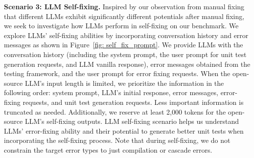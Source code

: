 
\noindent\textbf{Scenario 3: LLM Self-fixing. } 
Inspired by our observation from manual fixing that different LLMs exhibit significantly different potentials after manual fixing, we seek to investigate how LLMs perform in self-fixing on our benchmark. 
We explore LLMs' self-fixing abilities by incorporating conversation history and error messages as shown in Figure~\ref{fig: self_fix_prompt}. We provide LLMs with the conversation history (including the system prompt, the user prompt for unit test generation requests, and LLM vanilla response), error messages obtained from the testing framework, and the user prompt for error fixing requests. 
When the open-source LLM's input length is limited, we prioritize the information in the following order: system prompt, LLM's initial response, error messages, error-fixing requests, and unit test generation requests. Less important information is truncated as needed. Additionally, we reserve at least 2,000 tokens for the open-source LLM’s self-fixing outputs.
LLM self-fixing scenario helps us understand LLMs' error-fixing ability and their potential to generate better unit tests when incorporating the self-fixing process. 
Note that during self-fixing, we do not constrain the target error types to just compilation or cascade errors. 



